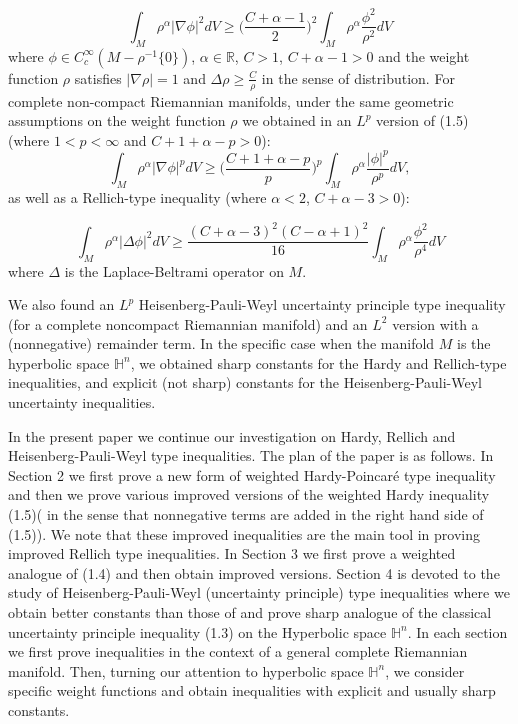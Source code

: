 \documentclass[12pt]{amsart}
\numberwithin{equation}{section}
\numberwithin{theorem}{section}
\numberwithin{theorem}{section} \numberwithin{lemma}{section}
\numberwithin{definition}{section}
\numberwithin{corollary}{section}
\numberwithin{remark}{section}
\numberwithin{proposition}{section}
\begin{document}
\begin{equation}\int_M \rho^{\alpha}|\nabla \phi|^2dV\ge
\Big(\frac{C+\alpha-1}{2}\Big)^2\int_
M\rho^{\alpha}\frac{\phi^2}{\rho^2}dV\end{equation} where
 $\phi\in
C_c^{\infty}(M-\rho^{-1}\{0\})$, $\alpha\in \mathbb{R}$, $C>1$,
$C+\alpha-1>0$ and the weight function $\rho$ satisfies  $|\nabla
\rho|=1$ and $\Delta\rho\ge \frac{C}{\rho}$ in the sense of
distribution. For complete non-compact Riemannian manifolds, under
the same geometric assumptions on the weight function $\rho$ we
obtained in \cite{Kombe-Ozaydin} an $L^p$ version of (1.5) (where
$ 1< p<\infty$ and $ C+1+\alpha-p>0$):
\begin{equation} \int _M\rho ^{\alpha}|\nabla\phi|^p dV\ge
\Big(\frac{C+1+\alpha-p}{p}\Big)^p\int _M
\rho^{\alpha}\frac{|\phi|^p}{\rho^ p}dV,\end{equation}  as well as
a Rellich-type inequality (where $\alpha<2$, $C+\alpha-3>0$):

\begin{equation}\int_{M}\rho^{\alpha}|\Delta \phi|^2dV \ge
\frac{(C+\alpha-3)^2(C-\alpha+1)^2}{16}
\int_{M}\rho^{\alpha}\frac{\phi^2}{\rho^4}dV\end{equation}
where $\Delta$ is the Laplace-Beltrami operator on $M$.
\medskip

We also found an $L^p$ Heisenberg-Pauli-Weyl uncertainty principle
type inequality (for a complete noncompact Riemannian manifold) and
an $L^2$ version with a (nonnegative) remainder term. In the
specific case when the manifold $M$ is the hyperbolic space
$\mathbb{H}^n$, we obtained sharp constants  for the Hardy and
Rellich-type inequalities, and  explicit (not sharp) constants for
the Heisenberg-Pauli-Weyl uncertainty inequalities.
\medskip

In the present paper we continue our investigation on Hardy, Rellich
and Heisenberg-Pauli-Weyl type inequalities. The plan of the paper
is as follows. In Section 2 we first prove a new form of weighted
Hardy-Poincar\'e type inequality and then  we prove various improved
versions of the weighted Hardy inequality (1.5)( in the sense that
nonnegative terms are added in the right hand side of (1.5)). We
note that these improved inequalities are the main  tool in proving
improved Rellich type inequalities. In Section 3 we first prove a
weighted analogue of (1.4) and then obtain improved versions.
Section 4 is devoted to the study of Heisenberg-Pauli-Weyl
(uncertainty principle) type inequalities where we obtain  better
constants than those  of \cite{Kombe-Ozaydin} and prove sharp
analogue of the classical  uncertainty principle inequality (1.3) on
the Hyperbolic space $\mathbb{H}^n$. In each section we first prove
inequalities in the context of a general complete Riemannian
manifold. Then, turning our attention to hyperbolic space
$\mathbb{H}^n$,  we consider specific weight functions and obtain
inequalities with explicit and usually sharp constants.
\end{document}
